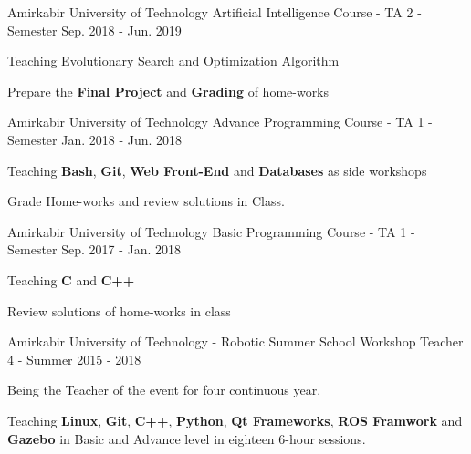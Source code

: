 

\begin{cventries}

  \cventry
    {Amirkabir University of Technology} %
    {Artificial Intelligence Course - TA} %
    {2 - Semester} %
    {Sep. 2018 - Jun. 2019} %
    {
      \begin{cvitems} %
        \item {Teaching Evolutionary Search and Optimization Algorithm}
        \item {Prepare the \textbf{Final Project} and \textbf{Grading} of home-works}
      \end{cvitems}
    }
    
    
\cventry
{Amirkabir University of Technology} %
{Advance Programming Course - TA} %
{1 - Semester} %
{Jan. 2018 - Jun. 2018} %
{
  \begin{cvitems} %
    \item {Teaching \textbf{Bash}, \textbf{Git}, \textbf{Web Front-End} and \textbf{Databases} as side workshops}
    \item {Grade Home-works and review solutions in Class.}
  \end{cvitems}
}


\cventry
{Amirkabir University of Technology} %
{Basic Programming Course - TA} %
{1 - Semester} %
{Sep. 2017 - Jan. 2018} %
{
  \begin{cvitems} %
    \item {Teaching \textbf{C} and \textbf{C++}}
    \item {Review solutions of home-works in class}
  \end{cvitems}
}


  \cventry
    {Amirkabir University of Technology - Robotic Summer School} %
    {Workshop Teacher} %
    {4 - Summer} %
    {2015 - 2018} %
    {
      \begin{cvitems} %
        \item {Being the Teacher of the event for four continuous year.}
        \item {Teaching \textbf{Linux}, \textbf{Git}, \textbf{C++}, \textbf{Python}, \textbf{Qt Frameworks}, \textbf{ROS Framwork} and \textbf{Gazebo} in Basic and Advance level in eighteen 6-hour sessions.}
      \end{cvitems}
    }
    

\end{cventries}
